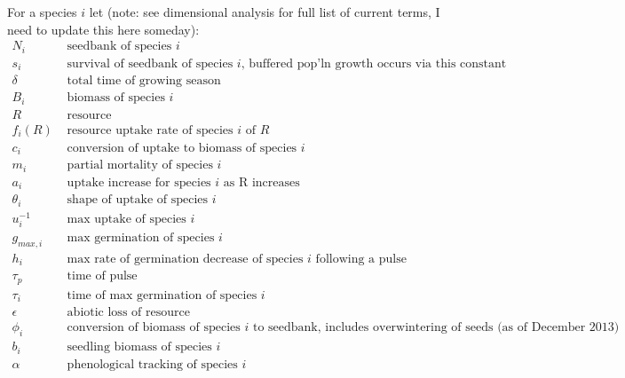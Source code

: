 \documentclass[11pt,a4paper,oneside]{article}
\begin{document}
\noindent For a species \(i\) let (note: see dimensional analysis for full list of current terms, I need to update this here someday):
\begin{align*}
N_{i} & \text{   seedbank of species } i
\\
s_{i} & \text{   survival of seedbank of species } i \text{, buffered pop'ln
  growth occurs via this constant}
\\
\delta & \text{   total time of growing season}
\\
B_{i} &  \text{   biomass of species } i
\\
R &   \text{   resource}
\\
f_{i}(R) & \text{  resource uptake rate of species } i \text{ of } R
\\
c_{i} & \text{   conversion of uptake to biomass of species } i
\\
m_{i} & \text{   partial mortality of species } i
\\
a_{i} & \text{   uptake increase for species } i \text{ as R increases}
\\
\theta_{i} & \text{   shape of uptake of species } i
\\
u_{i}^{-1} & \text{   max uptake of species } i
\\
g_{max,i} & \text{   max germination of species } i
\\
h_{i} & \text{   max rate of germination decrease of species } i
\text{ following a pulse}
\\
\tau_{p} & \text{   time of pulse }
\\
\tau_{i} & \text{   time of max germination of species } i
\\
\epsilon & \text{   abiotic loss of resource}
\\
\phi_{i} & \text{   conversion of biomass of species } i \text{ to
  seedbank, includes overwintering of seeds (as of December 2013)}
\\
b_{i} & \text{   seedling biomass of species } i
\\
\alpha & \text{   phenological tracking of species  } i
\\
\end{align*}

\newpage 
\end{document}
